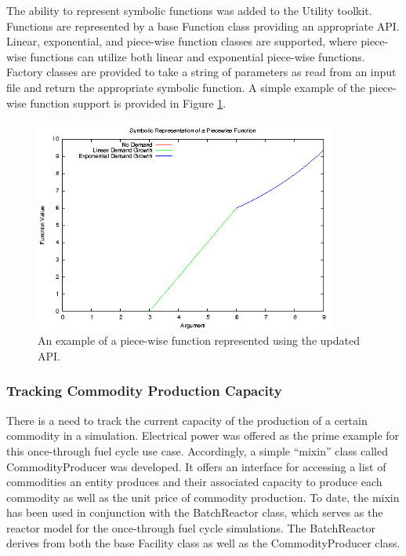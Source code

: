 The ability to represent symbolic functions was added to the \Cyclus Utility
toolkit. Functions are represented by a base Function class providing an
appropriate API. Linear, exponential, and piece-wise function classes are
supported, where piece-wise functions can utilize both linear and exponential
piece-wise functions. Factory classes are provided to take a string of parameters
as read from an input file and return the appropriate symbolic function. A
simple example of the piece-wise function support is provided in Figure
\ref{fig:piecewise}.

\begin{figure}[H]
  \begin{center}
    \includegraphics[height=7cm]{./chapters/prevwork/piecewise.png}
  \caption{An example of a piece-wise function represented using the updated API.}
  \label{fig:piecewise}
  \end{center}
\end{figure}

\subsubsection{Tracking Commodity Production Capacity}

There is a need to track the current capacity of the production of a certain
commodity in a simulation. Electrical power was offered as the prime example for
this once-through fuel cycle use case. Accordingly, a simple ``mixin'' class
\cite{ulrich_mixin-based_2001} called CommodityProducer was developed. It offers
an interface for accessing a list of commodities an entity produces and their
associated capacity to produce each commodity as well as the unit price of
commodity production. To date, the mixin has been used in conjunction with the
BatchReactor class, which serves as the reactor model for the once-through fuel
cycle simulations. The BatchReactor derives from both the base Facility class
as well as the CommodityProducer class.

